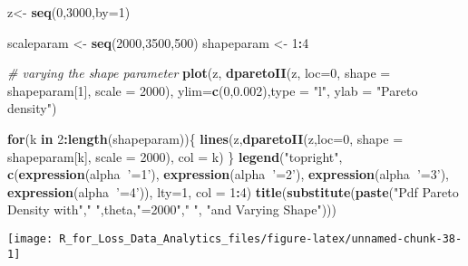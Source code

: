 \documentclass[]{book}
\newenvironment{Shaded}{\begin{snugshade}}{\end{snugshade}}
\newcommand{\KeywordTok}[1]{\textcolor[rgb]{0.13,0.29,0.53}{\textbf{#1}}}
\newcommand{\DataTypeTok}[1]{\textcolor[rgb]{0.13,0.29,0.53}{#1}}
\newcommand{\DecValTok}[1]{\textcolor[rgb]{0.00,0.00,0.81}{#1}}
\newcommand{\FloatTok}[1]{\textcolor[rgb]{0.00,0.00,0.81}{#1}}
\newcommand{\StringTok}[1]{\textcolor[rgb]{0.31,0.60,0.02}{#1}}
\newcommand{\CommentTok}[1]{\textcolor[rgb]{0.56,0.35,0.01}{\textit{#1}}}
\newcommand{\ControlFlowTok}[1]{\textcolor[rgb]{0.13,0.29,0.53}{\textbf{#1}}}
\newcommand{\OperatorTok}[1]{\textcolor[rgb]{0.81,0.36,0.00}{\textbf{#1}}}
\newcommand{\NormalTok}[1]{#1}
\theoremstyle{definition}
\theoremstyle{definition}
\theoremstyle{definition}
\theoremstyle{remark}
\begin{document}
\begin{Shaded}
\begin{Highlighting}[]
\NormalTok{z<-}\StringTok{ }\KeywordTok{seq}\NormalTok{(}\DecValTok{0}\NormalTok{,}\DecValTok{3000}\NormalTok{,}\DataTypeTok{by=}\DecValTok{1}\NormalTok{)}

\NormalTok{scaleparam <-}\StringTok{ }\KeywordTok{seq}\NormalTok{(}\DecValTok{2000}\NormalTok{,}\DecValTok{3500}\NormalTok{,}\DecValTok{500}\NormalTok{)}
\NormalTok{shapeparam <-}\StringTok{ }\DecValTok{1}\OperatorTok{:}\DecValTok{4}

\CommentTok{# varying the shape parameter}
\KeywordTok{plot}\NormalTok{(z, }\KeywordTok{dparetoII}\NormalTok{(z, }\DataTypeTok{loc=}\DecValTok{0}\NormalTok{, }\DataTypeTok{shape =}\NormalTok{ shapeparam[}\DecValTok{1}\NormalTok{], }\DataTypeTok{scale =} \DecValTok{2000}\NormalTok{), }\DataTypeTok{ylim=}\KeywordTok{c}\NormalTok{(}\DecValTok{0}\NormalTok{,}\FloatTok{0.002}\NormalTok{),}\DataTypeTok{type =} \StringTok{"l"}\NormalTok{, }\DataTypeTok{ylab =} \StringTok{"Pareto density"}\NormalTok{)}

\ControlFlowTok{for}\NormalTok{(k }\ControlFlowTok{in} \DecValTok{2}\OperatorTok{:}\KeywordTok{length}\NormalTok{(shapeparam))\{}
  \KeywordTok{lines}\NormalTok{(z,}\KeywordTok{dparetoII}\NormalTok{(z,}\DataTypeTok{loc=}\DecValTok{0}\NormalTok{, }\DataTypeTok{shape =}\NormalTok{ shapeparam[k], }\DataTypeTok{scale =} \DecValTok{2000}\NormalTok{), }\DataTypeTok{col =}\NormalTok{ k)}
\NormalTok{\}}
\KeywordTok{legend}\NormalTok{(}\StringTok{"topright"}\NormalTok{, }\KeywordTok{c}\NormalTok{(}\KeywordTok{expression}\NormalTok{(alpha}\OperatorTok{~}\StringTok{'=1'}\NormalTok{), }\KeywordTok{expression}\NormalTok{(alpha}\OperatorTok{~}\StringTok{'=2'}\NormalTok{), }\KeywordTok{expression}\NormalTok{(alpha}\OperatorTok{~}\StringTok{'=3'}\NormalTok{), }\KeywordTok{expression}\NormalTok{(alpha}\OperatorTok{~}\StringTok{'=4'}\NormalTok{)), }\DataTypeTok{lty=}\DecValTok{1}\NormalTok{, }\DataTypeTok{col =} \DecValTok{1}\OperatorTok{:}\DecValTok{4}\NormalTok{)}
\KeywordTok{title}\NormalTok{(}\KeywordTok{substitute}\NormalTok{(}\KeywordTok{paste}\NormalTok{(}\StringTok{"Pdf Pareto Density with"}\NormalTok{,}\StringTok{" "}\NormalTok{,theta,}\StringTok{"=2000"}\NormalTok{,}\StringTok{" "}\NormalTok{, }\StringTok{"and Varying Shape"}\NormalTok{)))}
\end{Highlighting}
\end{Shaded}

\begin{center}\texttt{[image: R\_for\_Loss\_Data\_Analytics\_files/figure-latex/unnamed-chunk-38-1]} \end{center}
\end{document}
